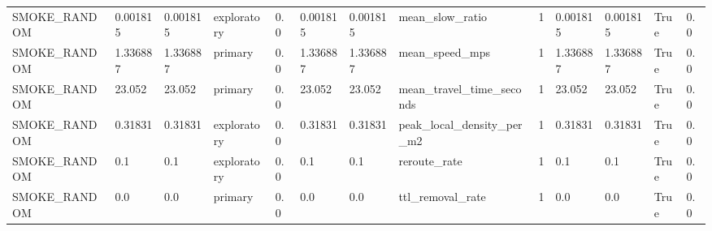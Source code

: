 \begin{tabular}{lllllllllllll}
SMOKE\_RANDOM & 0.001815 & 0.001815 & exploratory & 0.0 & 0.001815 & 0.001815 & mean\_slow\_ratio & 1 & 0.001815 & 0.001815 & True & 0.0 \\
SMOKE\_RANDOM & 1.336887 & 1.336887 & primary & 0.0 & 1.336887 & 1.336887 & mean\_speed\_mps & 1 & 1.336887 & 1.336887 & True & 0.0 \\
SMOKE\_RANDOM & 23.052 & 23.052 & primary & 0.0 & 23.052 & 23.052 & mean\_travel\_time\_seconds & 1 & 23.052 & 23.052 & True & 0.0 \\
SMOKE\_RANDOM & 0.31831 & 0.31831 & exploratory & 0.0 & 0.31831 & 0.31831 & peak\_local\_density\_per\_m2 & 1 & 0.31831 & 0.31831 & True & 0.0 \\
SMOKE\_RANDOM & 0.1 & 0.1 & exploratory & 0.0 & 0.1 & 0.1 & reroute\_rate & 1 & 0.1 & 0.1 & True & 0.0 \\
SMOKE\_RANDOM & 0.0 & 0.0 & primary & 0.0 & 0.0 & 0.0 & ttl\_removal\_rate & 1 & 0.0 & 0.0 & True & 0.0 \\
\hline
\end{tabular}
